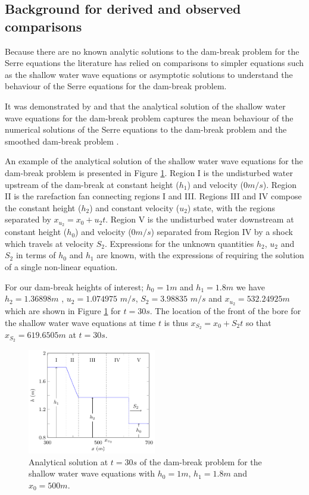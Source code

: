 \documentclass[times]{elsarticle}
\begin{document}
\subsection{Background for derived and observed comparisons}
Because there are no known analytic solutions to the dam-break problem for the Serre equations the literature has relied on comparisons to simpler equations such as the shallow water wave equations \cite{Hank-etal-2010-2034,Mitsotakis-etal-2014} or asymptotic solutions \cite{El-etal-2006} to understand the behaviour of the Serre equations for the dam-break problem.

It was demonstrated by \citet{Hank-etal-2010-2034} and \citet{Mitsotakis-etal-2014} that the analytical solution of the shallow water wave equations for the dam-break problem captures the mean behaviour of the numerical solutions of the Serre equations to the dam-break problem \cite{Hank-etal-2010-2034} and the smoothed dam-break problem \cite{Mitsotakis-etal-2014}. 

An example of the analytical solution of the shallow water wave equations for the dam-break problem is presented in Figure \ref{fig:SWWEanadiagram}. Region I is the undisturbed water upstream of the dam-break at constant height ($h_1$) and velocity ($0m/s$). Region II is the rarefaction fan connecting regions I and III. Regions III and IV compose the constant height ($h_2$) and constant velocity ($u_2$) state, with the regions separated by $x_{u_2} = x_0 + u_2t$. Region V is the undisturbed water downstream at constant height ($h_0$) and velocity ($0m/s$) separated from Region IV by a shock which travels at velocity $S_2$. Expressions for the unknown quantities $h_2$, $u_2$ and $S_2$ in terms of $h_0$ and $h_1$ are known, with the expressions of \citet{Wu-etal-1999-1210} requiring the solution of a single non-linear equation.

For our dam-break heights of interest; $h_0 =1m$ and $h_1 = 1.8m$ we have $h_2 = 1.36898m$ , $u_2 = 1.074975$ $m/s$, $S_2 = 3.98835$ $m/s$ and $x_{u_2} = 532.24925m$ which are shown in Figure \ref{fig:SWWEanadiagram} for $t=30s$. The location of the front of the bore for the shallow water wave equations at time $t$ is thus $x_{S_2} = x_0 + S_2 t$ so that $x_{S_2} = 619.6505m$ at $t=30s$.

\begin{figure}
	\centering
	\includegraphics[width=0.5\textwidth]{Figure-2.pdf}
	\caption{Analytical solution at $t=30s$ of the dam-break problem for the shallow water wave equations with $h_0 = 1m$, $h_1=1.8m$ and $x_0=500m$.}
	\label{fig:SWWEanadiagram}
\end{figure}
\end{document}
